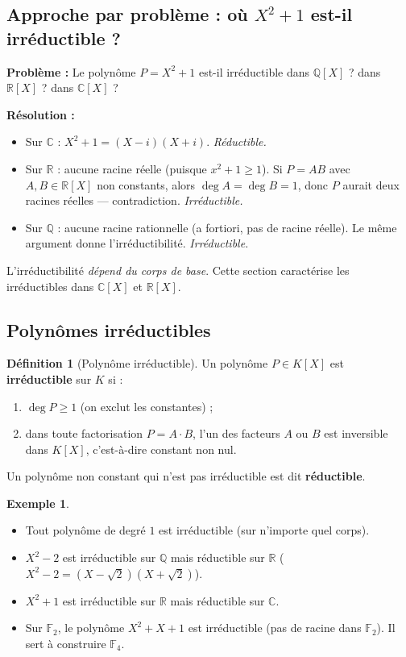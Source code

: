 \documentclass[12pt,a4paper]{report}
\theoremstyle{definition}
\newtheorem{definition}{Définition}[section]
\newtheorem{exemple}{Exemple}[section]
\theoremstyle{remark}
\begin{document}
\subsection{Approche par problème : où $X^2 + 1$ est-il irréductible ?}
\textbf{Problème :} Le polynôme $P = X^2 + 1$ est-il irréductible dans $\mathbb{Q}[X]$ ? dans $\mathbb{R}[X]$ ? dans $\mathbb{C}[X]$ ?

\textbf{Résolution :}
\begin{itemize}
    \item Sur $\mathbb{C}$ : $X^2 + 1 = (X - i)(X + i)$. \emph{Réductible.}
    \item Sur $\mathbb{R}$ : aucune racine réelle (puisque $x^2 + 1 \ge 1$). Si $P = AB$ avec $A, B \in \mathbb{R}[X]$ non constants, alors $\deg A = \deg B = 1$, donc $P$ aurait deux racines réelles --- contradiction. \emph{Irréductible.}
    \item Sur $\mathbb{Q}$ : aucune racine rationnelle (a fortiori, pas de racine réelle). Le même argument donne l'irréductibilité. \emph{Irréductible.}
\end{itemize}

L'irréductibilité \emph{dépend du corps de base}. Cette section caractérise les irréductibles dans $\mathbb{C}[X]$ et $\mathbb{R}[X]$.

\subsection{Polynômes irréductibles}

\begin{definition}[Polynôme irréductible]
Un polynôme $P \in K[X]$ est \textbf{irréductible} sur $K$ si :
\begin{enumerate}
    \item $\deg P \ge 1$ (on exclut les constantes) ;
    \item dans toute factorisation $P = A \cdot B$, l'un des facteurs $A$ ou $B$ est inversible dans $K[X]$, c'est-à-dire constant non nul.
\end{enumerate}
Un polynôme non constant qui n'est pas irréductible est dit \textbf{réductible}.
\end{definition}

\begin{exemple}
\begin{itemize}
    \item Tout polynôme de degré $1$ est irréductible (sur n'importe quel corps).
    \item $X^2 - 2$ est irréductible sur $\mathbb{Q}$ mais réductible sur $\mathbb{R}$ ($X^2 - 2 = (X - \sqrt{2})(X + \sqrt{2})$).
    \item $X^2 + 1$ est irréductible sur $\mathbb{R}$ mais réductible sur $\mathbb{C}$.
    \item Sur $\mathbb{F}_2$, le polynôme $X^2 + X + 1$ est irréductible (pas de racine dans $\mathbb{F}_2$). Il sert à construire $\mathbb{F}_4$.
\end{itemize}
\end{exemple}
\end{document}
